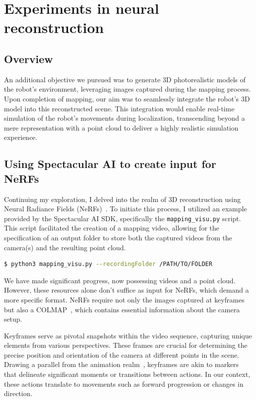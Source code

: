 \chapter{Experiments in neural reconstruction} \label{nerf_gsplat}

\section{Overview}

An additional objective we pursued was to generate 3D photorealistic models of the robot's environment, leveraging images captured during the mapping process. Upon completion of mapping, our aim was to seamlessly integrate the robot's 3D model into this reconstructed scene. This integration would enable real-time simulation of the robot's movements during localization, transcending beyond a mere representation with a point cloud to deliver a highly realistic simulation experience.


\section{Using Spectacular AI to create input for NeRFs}

Continuing my exploration, I delved into the realm of 3D reconstruction using Neural Radiance Fields (NeRFs)~\cite{nerf}. To initiate this process, I utilized an example provided by the Spectacular AI SDK, specifically the \verb|mapping_visu.py| script. This script facilitated the creation of a mapping video, allowing for the specification of an output folder to store both the captured videos from the camera(s) and the resulting point cloud.

\begin{lstlisting}[language=bash,frame=single,float=!ht]
$ python3 mapping_visu.py --recordingFolder /PATH/TO/FOLDER
\end{lstlisting}

We have made significant progress, now possessing videos and a point cloud. However, these resources alone don't suffice as input for NeRFs, which demand a more specific format. NeRFs require not only the images captured at keyframes but also a COLMAP~\cite{colmap}, which contains essential information about the camera setup.

Keyframes serve as pivotal snapshots within the video sequence, capturing unique elements from various perspectives. These frames are crucial for determining the precise position and orientation of the camera at different points in the scene. Drawing a parallel from the animation realm~\cite{keyframes_in_animation}, keyframes are akin to markers that delineate significant moments or transitions between actions. In our context, these actions translate to movements such as forward progression or changes in direction.

